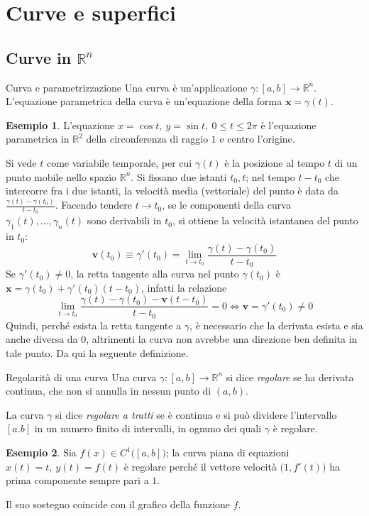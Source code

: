 \documentclass[11pt, a4paper]{scrartcl}
\theoremstyle{definition}
\newtheorem{esempio}{Esempio}
\numberwithin{esempio}{section}
\theoremstyle{definition}
\numberwithin{obs}{section}
\numberwithin{nota}{section}
\numberwithin{equation}{subsection}
\begin{document}
\section{Curve e superfici}
\subsection{Curve in $\mathbb{R}^n$}
\begin{definizione}
	{Curva e parametrizzazione}{}
	Una curva \`e un'applicazione $\gamma: [a,b] \to \mathbb{R}^n$. L'equazione parametrica della curva \`e un'equazione della forma $\mathbf{x}  = \gamma(t)$.
\end{definizione}
\begin{esempio}
L'equazione $x = \cos t , \ y = \sin t, \ 0\le t\le 2\pi$ \`e l'equazione parametrica in $\mathbb{R}^2$ della circonferenza di raggio $1$ e centro l'origine.
\end{esempio}
\noindent Si vede $t$ come variabile temporale, per cui $\gamma(t)$ \`e la posizione al tempo $t$ di un punto mobile nello spazio $\mathbb{R}^n$. 
Si fissano due istanti $t_0,t$; nel tempo $t-t_0$ che intercorre fra i due istanti, la velocit\`a media (vettoriale) del punto \`e data da $\frac{\gamma(t) - \gamma(t_0)}{t-t_0}$.
Facendo tendere $t\to t_0$, se le componenti della curva $\gamma_1(t) , \ldots, \gamma_n(t)$ sono derivabili in $t_0$, si ottiene la velocit\`a istantanea del punto in $t_0$:
\[
\mathbf{v} (t_0) \equiv \gamma'(t_0) = \lim_{t \to t_0} \frac{\gamma(t) - \gamma(t_0)}{t-t_0}
\] 
Se $\gamma'(t_0) \neq 0 $, la retta tangente alla curva nel punto $\gamma(t_{0})$ \`e $\mathbf{x} = \gamma(t_0) + \gamma'(t_0) ( t-t_0)$, infatti la relazione 
\[
\lim_{t \to t_0} \frac{\gamma(t) - \gamma(t_0) -\mathbf{v}(t-t_0)}{t-t_0} = 0 \iff \mathbf{v} = \gamma'(t_0)\neq 0
\] 
Quindi, perch\'e esista la retta tangente a $\gamma$, \`e necessario che la derivata esista e sia anche diversa da $0$, altrimenti la curva non avrebbe una direzione ben definita in tale punto.
Da qui la seguente definizione.
\begin{definizione}
	{Regolarit\`a di una curva}{}
	Una curva $\gamma:[a,b]  \to \mathbb{R}^n$ si dice \textit{regolare} se ha derivata continua, che non si annulla in nessun punto di $(a,b)$.

	La curva $\gamma$ si dice \textit{regolare a tratti} se \`e continua e si pu\`o dividere l'intervallo $[a.b]$ in un numero finito di intervalli, in ognuno dei quali $\gamma$ \`e regolare.
\end{definizione}
\begin{esempio}
	Sia $f(x) \in C^1\big([a,b]\big)$; la curva piana di equazioni $x(t) = t, \ y(t) = f(t)$ \`e regolare perch\'e il vettore velocit\`a $\big(1,f'(t)\big)$ ha prima componente sempre pari a $1$.

	Il suo sostegno coincide con il grafico della funzione $f$.
\end{esempio}
\end{document}
